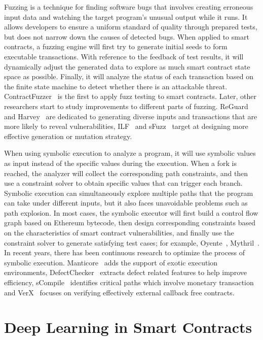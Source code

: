 Fuzzing is a technique for finding software bugs that involves creating erroneous input data and watching the target program's unusual output while it runs.
It allows developers to ensure a uniform standard of quality through prepared tests, but does not narrow down the causes of detected bugs.
When applied to smart contracts, a fuzzing engine will first try to generate initial seeds to form executable transactions.
With reference to the feedback of test results, it will dynamically adjust the generated data to explore as much smart contract state space as possible.
Finally, it will analyze the status of each transaction based on the finite state machine to detect whether there is an attackable threat.
ContractFuzzer~\cite{contractfuzzer} is the first to apply fuzz testing to smart contracts. Later, other researchers start to study improvements to different parts of fuzzing.
ReGuard~\cite{liu2018reguard} and Harvey~\cite{wustholz2020harvey} are dedicated to generating diverse inputs and transactions that are more likely to reveal vulnerabilities,
ILF~\cite{he2019learning} and sFuzz~\cite{nguyen2020sfuzz} target at designing more effective generation or mutation strategy.


When using symbolic execution to analyze a program, it will use symbolic values as input instead of the specific values during the execution.
When a fork is reached, the analyzer will collect the corresponding path constraints, and then use a constraint solver to obtain specific values that can trigger each branch.
Symbolic execution can simultaneously explore multiple paths that the program can take under different inputs, but it also faces unavoidable problems such as path explosion.
In most cases, the symbolic executor will first build a control flow graph based on Ethereum bytecode, then design corresponding constraints based on the characteristics of
smart contract vulnerabilities, and finally use the constraint solver to generate satisfying test cases; for example, Oyente~\cite{oyente}, Mythril~\cite{mythril}.
In recent years, there has been continuous research to optimize the process of symbolic execution.
Manticore~\cite{mossberg2019manticore} adds the support of exotic execution environments, DefectChecker~\cite{chen2021defectchecker} extracts defect related features to help
improve efficiency, sCompile~\cite{chang2019scompile} identifies critical paths which involve monetary transaction and VerX~\cite{permenev2020verx} focuses on verifying
effectively external callback free contracts.

\section{Deep Learning in Smart Contracts} \label{sec:dl-models}

